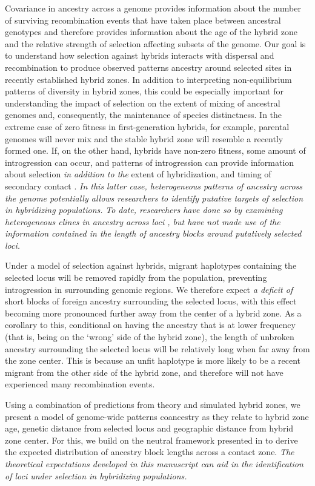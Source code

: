 \documentclass[11pt,letterpaper]{article}
\newcommand{\yb}[1]{{\em \color{magenta} #1}}
\begin{document}
Covariance in ancestry across a genome provides information about the number of surviving recombination events that have taken place between ancestral genotypes and therefore provides information about the age of the hybrid zone and the relative strength of selection affecting subsets of the genome. Our goal is to understand how selection against hybrids interacts with dispersal and recombination to produce observed patterns ancestry around selected sites in recently established hybrid zones. In addition to interpreting non-equilibrium patterns of diversity in hybrid zones, this could be especially important for understanding the impact of selection on the extent of mixing of ancestral genomes and, consequently, the maintenance of species distinctness. In the extreme case of zero fitness in first-generation hybrids, for example, parental genomes will never mix and the stable hybrid zone will resemble a recently formed one. 
If, on the other hand, hybrids have non-zero fitness, some amount of introgression can occur, and  patterns of introgression can provide information about selection \yb{in addition to the} extent of hybridization, and timing of secondary contact \citep{Price2009, Hellenthal2014}. 
\yb{In this latter case, heterogeneous patterns of ancestry across the genome potentially allows researchers to identify putative targets of selection in hybridizing populations.}  
\yb{To date, researchers have done so by examining heterogeneous clines in ancestry across loci \citep{Porter1997, Gompert2012}, but have not made use of the information contained in the length of ancestry blocks around putatively selected loci.}  

Under a model of selection against hybrids, migrant haplotypes containing the selected locus will be removed rapidly from the population, preventing introgression in surrounding genomic regions. We therefore expect \yb{a deficit of} short blocks of foreign ancestry surrounding the selected locus, with this effect becoming more pronounced further away from the center of a hybrid zone. As a corollary to this, conditional on having the ancestry that is at lower frequency (that is, being on the `wrong' side of the hybrid zone), the length of unbroken ancestry surrounding the selected locus will be relatively long when far away from the zone center.  This is because an unfit haplotype is more likely to be a recent migrant from the other side of the hybrid zone, and therefore will not have experienced many recombination events. 

Using a combination of predictions from theory and simulated hybrid zones, we present a model of genome-wide patterns coancestry as they relate to hybrid zone age, genetic distance from selected locus and geographic distance from hybrid zone center. For this, we build on the neutral framework presented in \citet{Sedghifar2015} to derive the expected distribution of ancestry block lengths across a contact zone.  
\yb{The theoretical expectations developed in this manuscript can aid in the identification of loci under selection in hybridizing populations.} 
\end{document}
